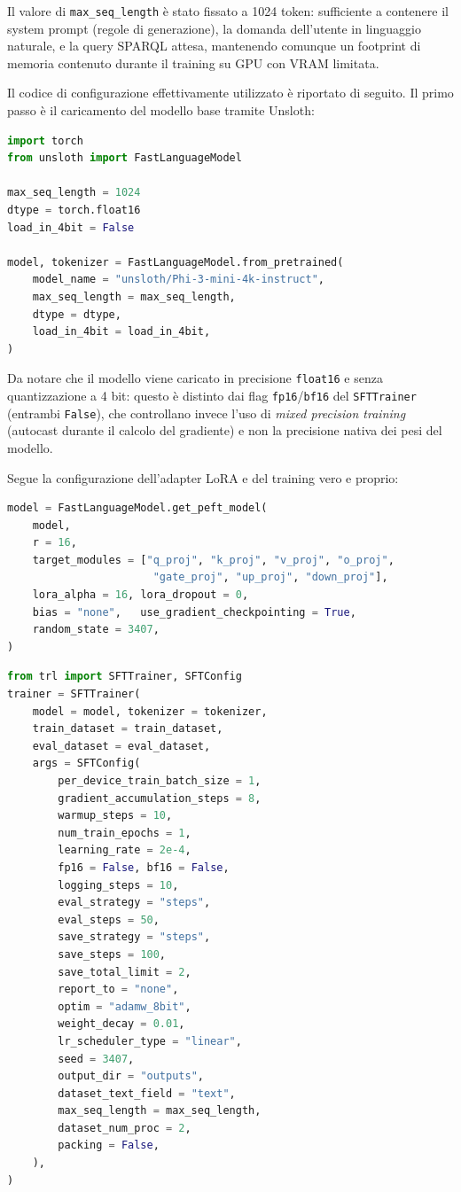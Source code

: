 \documentclass[12pt,a4paper,oneside]{book}
\newcommand{\code}[1]{\colorbox{light-gray}{\texttt{#1}}}
\begin{document}
Il valore di \code{max\_seq\_length} è stato fissato a 1024 token: sufficiente a contenere il system prompt (regole di generazione), la domanda dell'utente in linguaggio naturale, e la query SPARQL attesa, mantenendo comunque un footprint di memoria contenuto durante il training su GPU con VRAM limitata.
 
Il codice di configurazione effettivamente utilizzato è riportato di seguito. Il primo passo è il caricamento del modello base tramite Unsloth:

\vfill
 
\begin{lstlisting}[language=python, caption=Caricamento del modello base]
import torch
from unsloth import FastLanguageModel
 
max_seq_length = 1024
dtype = torch.float16
load_in_4bit = False
 
model, tokenizer = FastLanguageModel.from_pretrained(
    model_name = "unsloth/Phi-3-mini-4k-instruct",
    max_seq_length = max_seq_length,
    dtype = dtype,
    load_in_4bit = load_in_4bit,
)
\end{lstlisting}
 
Da notare che il modello viene caricato in precisione \code{float16} e senza quantizzazione a 4 bit: questo è distinto dai flag \code{fp16}/\code{bf16} del \code{SFTTrainer} (entrambi \code{False}), che controllano invece l'uso di \textit{mixed precision training} (autocast durante il calcolo del gradiente) e non la precisione nativa dei pesi del modello.
 
Segue la configurazione dell'adapter LoRA e del training vero e proprio:
 
\begin{lstlisting}[language=python, caption=Configurazione dell'adapter LoRA tramite Unsloth]
model = FastLanguageModel.get_peft_model(
    model,
    r = 16,
    target_modules = ["q_proj", "k_proj", "v_proj", "o_proj",
                       "gate_proj", "up_proj", "down_proj"],
    lora_alpha = 16, lora_dropout = 0,
    bias = "none",   use_gradient_checkpointing = True,
    random_state = 3407,
)
\end{lstlisting}
 
\begin{lstlisting}[language=python, caption=Configurazione del training tramite SFTTrainer (libreria TRL)]
from trl import SFTTrainer, SFTConfig
trainer = SFTTrainer(
    model = model, tokenizer = tokenizer,
    train_dataset = train_dataset,
    eval_dataset = eval_dataset,
    args = SFTConfig(
        per_device_train_batch_size = 1,
        gradient_accumulation_steps = 8,
        warmup_steps = 10,
        num_train_epochs = 1,
        learning_rate = 2e-4,
        fp16 = False, bf16 = False,
        logging_steps = 10,
        eval_strategy = "steps",
        eval_steps = 50,
        save_strategy = "steps",
        save_steps = 100,
        save_total_limit = 2,
        report_to = "none",
        optim = "adamw_8bit",
        weight_decay = 0.01,
        lr_scheduler_type = "linear",
        seed = 3407,
        output_dir = "outputs",
        dataset_text_field = "text",
        max_seq_length = max_seq_length,
        dataset_num_proc = 2,
        packing = False,
    ),
)
\end{lstlisting}
\end{document}
